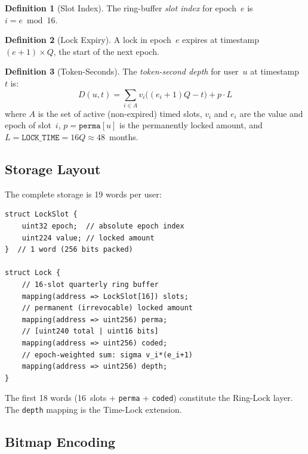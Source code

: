 \documentclass[10pt,a4paper,twocolumn]{article}
\theoremstyle{definition}
\newtheorem{definition}{Definition}[section]
\theoremstyle{plain}
\theoremstyle{remark}
\begin{document}
\begin{definition}[Slot Index]
\label{def:slot-index}
The ring-buffer \emph{slot index} for epoch~$e$ is $i = e \bmod 16$.
\end{definition}

\begin{definition}[Lock Expiry]
\label{def:lock-expiry}
A lock in epoch~$e$ expires at timestamp $(e{+}1) \times Q$, the start of the next epoch.
\end{definition}

\begin{definition}[Token-Seconds]
\label{def:token-seconds}
The \emph{token-second depth} for user~$u$ at timestamp~$t$ is:
\begin{equation}
\label{eq:token-seconds}
D(u,t) = \sum_{i \in A} v_i \bigl((e_i{+}1)Q - t\bigr) + p \cdot L
\end{equation}
where $A$ is the set of active (non-expired) timed slots, $v_i$ and $e_i$ are the value and epoch of slot~$i$, $p = \texttt{perma}[u]$ is the permanently locked amount, and $L = \texttt{LOCK\_TIME} = 16Q \approx 48$~months.
\end{definition}

\subsection{Storage Layout}
\label{subsec:storage-layout}

The complete storage is 19 words per user:

\begin{lstlisting}[language=Solidity, caption={Lock storage layout}, label={lst:lock-struct}]
struct LockSlot {
    uint32 epoch;  // absolute epoch index
    uint224 value; // locked amount
}  // 1 word (256 bits packed)

struct Lock {
    // 16-slot quarterly ring buffer
    mapping(address => LockSlot[16]) slots;
    // permanent (irrevocable) locked amount
    mapping(address => uint256) perma;
    // [uint240 total | uint16 bits]
    mapping(address => uint256) coded;
    // epoch-weighted sum: sigma v_i*(e_i+1)
    mapping(address => uint256) depth;
}
\end{lstlisting}

The first 18 words (16~slots + \texttt{perma} + \texttt{coded}) constitute the Ring-Lock layer. The \texttt{depth} mapping is the Time-Lock extension.

\subsection{Bitmap Encoding}
\label{subsec:bitmap}
\end{document}
